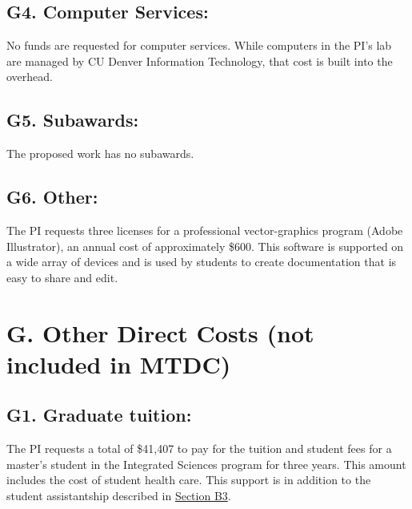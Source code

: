 \documentclass[11pt,oneside]{memoir}
\begin{document}
\subsection*{G4. Computer Services:}
No funds are requested for computer services.  While computers in the PI's lab are managed by CU Denver Information Technology, that cost is built into the overhead.

\subsection*{G5. Subawards:}
The proposed work has no subawards.

\subsection*{G6. Other:}

The PI requests three licenses for a professional vector-graphics program (Adobe Illustrator), an annual cost of approximately \$600. This software is supported on a wide array of devices and is used by students to create documentation that is easy to share and edit.


\section*{G. Other Direct Costs (not included in MTDC)}
%

\subsection{G1. Graduate tuition:}
The PI requests a total of \$41,407 to pay for the tuition and student fees for a master's student in the Integrated Sciences program for three years.  This amount includes the cost of student health care. This support is in addition to the student assistantship described in 
\hyperref[sec:masters-student-salary]{Section B3}.
\end{document}

